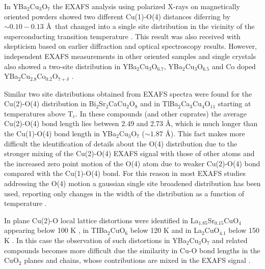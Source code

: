 In YBa$_2$Cu$_3$O$_7$ the EXAFS analysis using polarized X-rays on magnetically oriented powders showed two different Cu(1)-O(4) distances diferring by $\sim 0.10-0.13$ \AA\ that changed into a single site distribution in the vicinity of the superconducting transition temperature \cite{Conradson1990,MustredeLeon1992a}. 
This result was also received with skepticism based on earlier diffraction \cite{battlog1992lattice,Kwei1990,Sharma1991} and optical spectroscopy \cite{Thomsen1993} results. 
However, independent EXAFS measurements in other oriented samples \cite{Stern1993} and single crystals \cite{Booth1996} also showed a two-site distribution in YBa$_{2}$Cu$_{3}$O$_{6.7}$, YBa$_{2}$Cu$_{3}$O$_{6.5}$ and Co doped  YBa$_2$Cu$_{2.8}$Co$_{0.2}$O$_{7+\delta}$ \cite{MustredeLeon1991}. 

Similar two site distributions obtained from EXAFS spectra were found for the Cu(2)-O(4) distribution in Bi$_{2}$Sr$_{2}$CaCu$_{2}$O$_{8}$ \cite{bianconni1992lattice} and in TlBa$_{2}$Ca$_{3}$Cu$_{4}$O$_{11}$ \cite{Allen1991} starting at temperatures above T$_{c}$. 
In these compounds (and other cuprates) the average Cu(2)-O(4) bond length lies between 2.49 and 2.73 \AA, which is much longer than the Cu(1)-O(4) bond length in YBa$_{2}$Cu$_{3}$O$_{7}$ ($\sim 1.87$ \AA). 
This fact makes more difficult the identification of details about the O(4) distribution due to the stronger mixing of the Cu(2)-O(4) EXAFS signal with those of other atoms and the increased zero point motion of the O(4) atom due to weaker Cu(2)-O(4) bond compared with the Cu(1)-O(4) bond.
For this reason in most EXAFS studies addressing the O(4) motion a gaussian single site broadened distribution has been used, reporting only changes in the width of the distribution as a function of temperature \cite{Booth1995,Oyanagi2007,Zhang2009}.

In plane Cu(2)-O local lattice distortions were identified in La$_{1.85}$Sr$_{0.15}$CuO$_{4}$ appearing below 100 K \cite{Bianconi1996,Oyanagi2007}, in TIBa$_{2}$CuO$_{6}$ below 120 K \cite{Conradson1997} and in La$_{2}$CuO$_{4.1}$ below 150 K \cite{Lanzara1997,MustredeLeon:xj5003}. 
In this case the observation of such distortions in YBa$_{2}$Cu$_{3}$O$_{7}$ and related compounds becomes more difficult due the similarity in Cu-O bond lengths in the CuO$_2$ planes and chains, whose contributions are mixed in the EXAFS signal \cite{Conradson1997,MustredeLeon1992a}.

